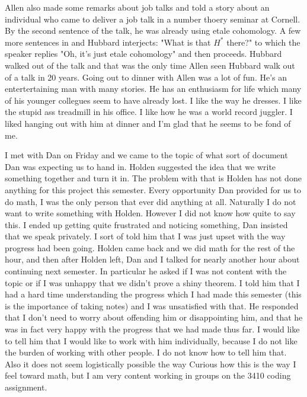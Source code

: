 \documentclass[12pt]{article}
\begin{document}
\hfill

Allen also made some remarks about job talks and told a story about an individual who came to deliver a job talk in a number thoery seminar at Cornell.
By the second sentence of the talk, he was already using etale cohomology. A few more sentences in and Hubbard interjects: "What is that $H^*$ there?" to which
the speaker replies "Oh, it's just etale cohomology" and then proceeds. Hubbard walked out of the talk and that was the only time Allen seen Hubbard walk out of a talk in 20 years.
Going out to dinner with Allen was a lot of fun. He's an entertertaining man with many stories. He has an enthusiasm for life which many of his younger collegues seem to have already lost.
I like the way he dresses. I like the stupid ass treadmill in his office. I like how he was a world record juggler. I liked hanging out with him at dinner and I'm glad that he seems to be fond of me.

\hfill

I met with Dan on Friday and we came to the topic of what sort of document Dan was expecting us to hand in. Holden suggested the idea that we write something together and turn it in.
The problem with that is Holden has not done anything for this project this semester. Every opportunity Dan provided for us to do math, I was the only person that ever did anything at all.
Naturally I do not want to write something with Holden. However I did not know how quite to say this. I ended up getting quite frustrated and noticing something, Dan insisted that we speak privately.
I sort of told him that I was just upset with the way progress had been going. Holden came back and we did math for the rest of the hour, and then after Holden left, Dan and I talked for nearly another hour
 about continuing next semester. In particular he asked if I was not content with the topic or if I was unhappy that we didn't prove a shiny theorem. I told him that I had a hard time understanding
 the progress which I had made this semester (this is the importance of taking notes) and I was unsatisfied with that. He responded that I don't need to worry about offending him or 
 disappointing him, and that he was in fact very happy with the progress that we had made thus far. I would like to tell him that I would like to work with him individually, because I do 
 not like the burden of working with other people. I do not know how to tell him that. Also it does not seem logistically possible the way
  Curious how this is the way I feel toward math, but I am very content working in groups on the 3410 coding assignment.
\end{document}
